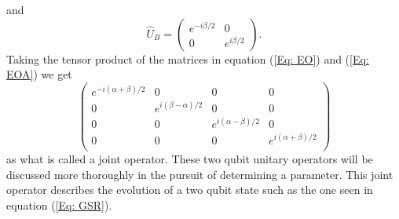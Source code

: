 \documentclass[twocolumn]{article}
\begin{document}
and
\begin{equation} \label{Eq: EOA}
\hat{U}_B=
\begin{pmatrix}
e^{-i\beta/2} & 0 \\
0 & e^{i\beta/2}
\end{pmatrix}.
\end{equation}
Taking the tensor product of the matrices in equation (\ref{Eq: EO}) and (\ref{Eq: EOA}) we get
\begin{equation} \label{Eq: TPOEO}
\left(\begin{array}{cccc}
e^{-i(\alpha+\beta)/2} & 0 & 0 & 0 \\
0 & e^{i(\beta-\alpha)/2} & 0 & 0 \\
0 & 0 & e^{i(\alpha-\beta)/2} & 0 \\
0 & 0 & 0 & e^{i(\alpha+\beta)/2} \\
\end{array}\right)
\end{equation}
as what is called a joint operator. These two qubit unitary operators will be discussed more thoroughly in the pursuit of determining a parameter. This joint operator describes the evolution of a two qubit state such as the one seen in equation (\ref{Eq: GSR}).
\end{document}
